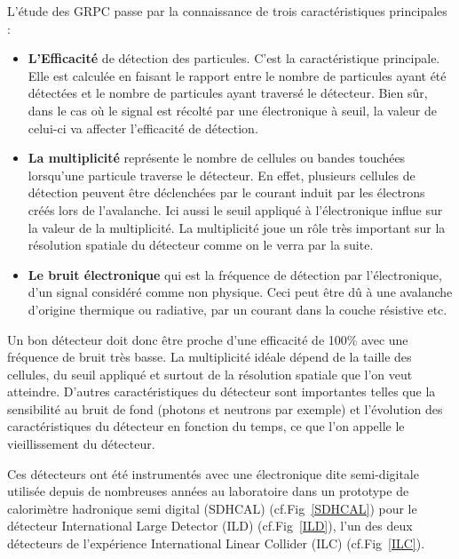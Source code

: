 L'étude des GRPC passe par la connaissance de trois caractéristiques principales :
\begin{itemize}[label=$\bullet$]
	\item \textbf{L'Efficacité} de détection des particules. C'est la caractéristique principale. Elle est calculée en faisant le rapport entre le nombre de particules ayant été détectées et le nombre de particules ayant traversé le détecteur. Bien sûr, dans le cas où le signal est récolté par une électronique à seuil, la valeur de celui-ci va affecter l'efficacité de détection.
	\item \textbf{La multiplicité} représente le nombre de cellules ou bandes touchées lorsqu'une particule traverse le détecteur. En effet, plusieurs cellules de détection peuvent être déclenchées par le courant induit par les électrons créés lors de l'avalanche. Ici aussi le seuil appliqué à l'électronique influe sur la valeur de la multiplicité. La multiplicité joue un rôle très important sur la résolution spatiale du détecteur comme on le verra par la suite.
	\item \textbf{Le bruit électronique} qui est la fréquence de détection par l'électronique, d'un signal considéré comme non physique. Ceci peut être dû à une avalanche d'origine thermique ou radiative, par un courant dans la couche résistive etc. 
\end{itemize}

Un bon détecteur doit donc être proche d'une efficacité de 100\% avec une fréquence de bruit très basse. La multiplicité idéale dépend de la taille des cellules, du seuil appliqué et surtout de la résolution spatiale que l'on veut atteindre. D'autres caractéristiques du détecteur sont importantes telles que la sensibilité au bruit de fond (photons et neutrons par exemple) et l'évolution des caractéristiques du détecteur en fonction du temps, ce que l'on appelle le vieillissement du détecteur.

Ces détecteurs ont été instrumentés avec une électronique dite semi-digitale utilisée depuis de nombreuses années au laboratoire dans un prototype de calorimètre hadronique semi digital (SDHCAL) (cf.Fig~\ref{SDHCAL}) \cite{Buridon:2016ill} pour le détecteur International Large Detector (ILD) (cf.Fig~\ref{ILD}), l'un des deux détecteurs de l'expérience International Linear Collider (ILC) (cf.Fig~\ref{ILC}).

